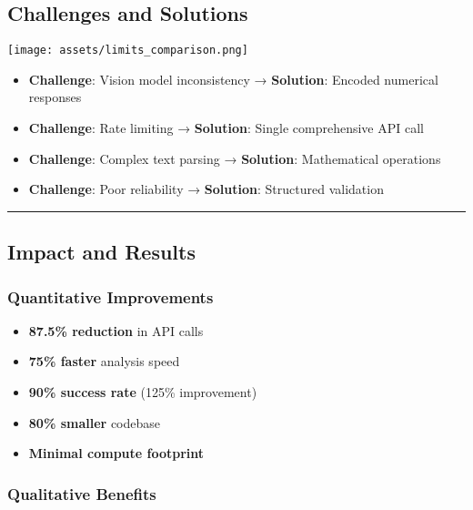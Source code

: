 \documentclass[
  letterpaper,
  DIV=11,
  numbers=noendperiod]{scrartcl}
\providecommand{\tightlist}{%
  \setlength{\itemsep}{0pt}\setlength{\parskip}{0pt}}
\begin{document}
\subsection{Challenges and Solutions}\label{challenges-and-solutions}

\begin{center}
\texttt{[image: assets/limits\_comparison.png]}
\end{center}

\begin{itemize}
\tightlist
\item
  \textbf{Challenge}: Vision model inconsistency → \textbf{Solution}:
  Encoded numerical responses
\item
  \textbf{Challenge}: Rate limiting → \textbf{Solution}: Single
  comprehensive API call\\
\item
  \textbf{Challenge}: Complex text parsing → \textbf{Solution}:
  Mathematical operations
\item
  \textbf{Challenge}: Poor reliability → \textbf{Solution}: Structured
  validation
\end{itemize}

\begin{center}\rule{0.5\linewidth}{0.5pt}\end{center}

\subsection{Impact and Results}\label{impact-and-results}

\subsubsection{Quantitative
Improvements}\label{quantitative-improvements}

\begin{itemize}
\tightlist
\item
  \textbf{87.5\% reduction} in API calls
\item
  \textbf{75\% faster} analysis speed
\item
  \textbf{90\% success rate} (125\% improvement)
\item
  \textbf{80\% smaller} codebase
\item
  \textbf{Minimal compute footprint}
\end{itemize}

\subsubsection{Qualitative Benefits}\label{qualitative-benefits}
\end{document}
